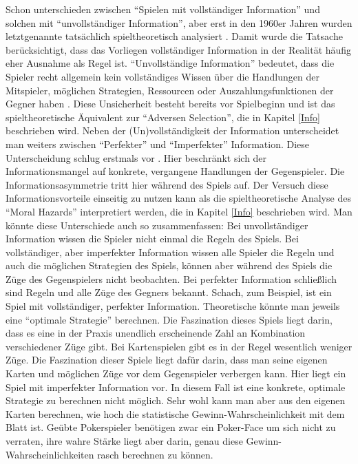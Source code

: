 Schon \textcite{Morgenstern1944} unterschieden zwischen "`Spielen mit vollständiger Information"' und solchen mit "`unvollständiger Information"', aber erst in den 1960er Jahren wurden letztgenannte tatsächlich spieltheoretisch analysiert \parencite[S. 137]{Harsanyi1994}. Damit wurde die Tatsache berücksichtigt, dass das Vorliegen vollständiger Information in der Realität häufig eher Ausnahme als Regel ist. "`Unvollständige Information"' bedeutet, dass die Spieler recht allgemein kein vollständiges Wissen über die Handlungen der Mitspieler, möglichen Strategien, Ressourcen oder Auszahlungsfunktionen der Gegner haben \parencite[S. 137]{Harsanyi1994}. Diese Unsicherheit besteht bereits vor Spielbeginn und ist das spieltheoretische Äquivalent zur "`Adversen Selection"', die in Kapitel \ref{Info} beschrieben wird. Neben der (Un)vollständigkeit der Information unterscheidet man weiters zwischen "`Perfekter"' und "`Imperfekter"' Information. Diese Unterscheidung schlug \textcite{Selten1965} erstmals vor \parencite[S. 166]{Nash1994}. Hier beschränkt sich der Informationsmangel auf konkrete, vergangene Handlungen der Gegenspieler.  Die Informationsasymmetrie tritt hier während des Spiels auf. Der Versuch diese Informationsvorteile einseitig zu nutzen kann als die spieltheoretische Analyse des "`Moral Hazards"' interpretiert werden, die in Kapitel \ref{Info} beschrieben wird. Man könnte diese Unterschiede auch so zusammenfassen: Bei unvollständiger Information wissen die Spieler nicht einmal die Regeln des Spiels. Bei vollständiger, aber imperfekter Information wissen alle Spieler die Regeln und auch die möglichen Strategien des Spiels, können aber während des Spiels die Züge des Gegenspielers nicht beobachten. Bei perfekter Information schließlich sind Regeln und alle Züge des Gegners bekannt. Schach, zum Beispiel, ist ein Spiel mit vollständiger, perfekter Information. Theoretische könnte man jeweils eine "`optimale Strategie"' berechnen. Die Faszination dieses Spiels liegt darin, dass es eine in der Praxis unendlich erscheinende Zahl an Kombination verschiedener Züge gibt. Bei Kartenspielen gibt es in der Regel wesentlich weniger Züge. Die Faszination dieser Spiele liegt dafür darin, dass man seine eigenen Karten und möglichen Züge vor dem Gegenspieler verbergen kann. Hier liegt ein Spiel mit imperfekter Information vor. In diesem Fall ist eine konkrete, optimale Strategie zu berechnen nicht möglich. Sehr wohl kann man aber aus den eigenen Karten berechnen, wie hoch die statistische Gewinn-Wahrscheinlichkeit mit dem Blatt ist. Geübte Pokerspieler benötigen zwar ein Poker-Face um sich nicht zu verraten, ihre wahre Stärke liegt aber darin, genau diese Gewinn-Wahrscheinlichkeiten rasch berechnen zu können.

